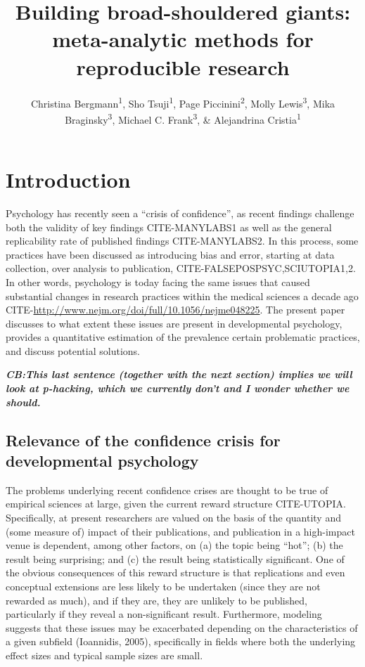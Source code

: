 \documentclass[english,floatsintext,man]{apa6}
\title{Building broad-shouldered giants: meta-analytic methods for reproducible
research}
\author{Christina Bergmann\textsuperscript{1}, Sho Tsuji\textsuperscript{1}, Page Piccinini\textsuperscript{2}, Molly Lewis\textsuperscript{3}, Mika Braginsky\textsuperscript{3}, Michael C. Frank\textsuperscript{3}, \& Alejandrina Cristia\textsuperscript{1}}
\affiliation{
    \vspace{0.5cm}
          \textsuperscript{1} Laboratoire de Sciences Cognitives et Psycholinguistique, ENS\\
          \textsuperscript{2} NeuroPsychologie Interventionnelle, ENS\\
          \textsuperscript{3} Department Psychology, Stanford University  }
\begin{document}
\maketitle



\section{Introduction}\label{introduction}

Psychology has recently seen a \enquote{crisis of confidence}, as recent
findings challenge both the validity of key findings CITE-MANYLABS1 as
well as the general replicability rate of published findings
CITE-MANYLABS2. In this process, some practices have been discussed as
introducing bias and error, starting at data collection, over analysis
to publication, CITE-FALSEPOSPSYC,SCIUTOPIA1,2. In other words,
psychology is today facing the same issues that caused substantial
changes in research practices within the medical sciences a decade ago
CITE-\url{http://www.nejm.org/doi/full/10.1056/nejme048225}. The present
paper discusses to what extent these issues are present in developmental
psychology, provides a quantitative estimation of the prevalence certain
problematic practices, and discuss potential solutions.

\textbf{\emph{CB:This last sentence (together with the next section)
implies we will look at p-hacking, which we currently don't and I wonder
whether we should.}}

\subsection{Relevance of the confidence crisis for developmental
psychology}\label{relevance-of-the-confidence-crisis-for-developmental-psychology}

The problems underlying recent confidence crises are thought to be true
of empirical sciences at large, given the current reward structure
CITE-UTOPIA. Specifically, at present researchers are valued on the
basis of the quantity and (some measure of) impact of their
publications, and publication in a high-impact venue is dependent, among
other factors, on (a) the topic being \enquote{hot}; (b) the result
being surprising; and (c) the result being statistically significant.
One of the obvious consequences of this reward structure is that
replications and even conceptual extensions are less likely to be
undertaken (since they are not rewarded as much), and if they are, they
are unlikely to be published, particularly if they reveal a
non-significant result. Furthermore, modeling suggests that these issues
may be exacerbated depending on the characteristics of a given subfield
(Ioannidis, 2005), specifically in fields where both the underlying
effect sizes and typical sample sizes are small.
\end{document}
